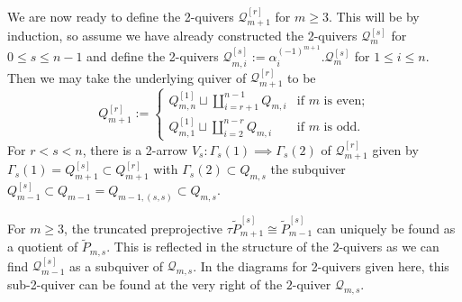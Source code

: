 \documentclass[smallextended,envcountsect,envcountsame]{svjour3}
\numberwithin{equation}{section}
\newcommand{\cQ}{\mathcal{Q}}
\begin{document}
We are now ready to define the 2-quivers $\cQ_{m+1}^{[r]}$ for $m\ge3$.
This will be by induction, so assume we have already constructed the 2-quivers $\cQ_m^{[s]}$ for $0\le s\le n-1$ and define the 2-quivers $\cQ_{m,i}^{[s]}:=\alpha_i^{(-1)^{m+1}}.\cQ_m^{[s]}$ for $1\le i\le n$. 
Then we may take the underlying quiver of $\cQ_{m+1}^{[r]}$ to be
\begin{equation}
  \label{eq:recursive 2-quivers}
  Q_{m+1}^{[r]}:=
  \begin{cases}
    Q_{m,n}^{[1]}\sqcup\coprod\limits_{i=r+1}^{n-1} Q_{m,i} & \text{if $m$ is even;}\\
    Q_{m,1}^{[1]}\sqcup\coprod\limits_{i=2}^{n-r} Q_{m,i} & \text{if $m$ is odd.}
  \end{cases}
\end{equation}
For $r<s<n$, there is a 2-arrow $V_s:\Gamma_s(1)\implies\Gamma_s(2)$ of $\cQ_{m+1}^{[r]}$ given by $\Gamma_s(1)=Q_{m+1}^{[s]}\subset Q_{m+1}^{[r]}$ with $\Gamma_s(2)\subset Q_{m,s}$ the subquiver $Q_{m-1}^{[s]}\subset Q_{m-1}=Q_{m-1,(s,s)}\subset Q_{m,s}$.
\begin{remark}
  For $m\geq 3$, the truncated preprojective $\tau\tilde P_{m+1}^{[s]}\cong\tilde P_{m-1}^{[s]}$ can uniquely be found as a quotient of $\tilde P_{m,s}$.
  This is reflected in the structure of the $2$-quivers as we can find $\cQ_{m-1}^{[s]}$ as a subquiver of $\cQ_{m,s}$.
  In the diagrams for 2-quivers given here, this sub-2-quiver can be found at the very right of the $2$-quiver $\mathcal Q_{m,s}$.
\end{remark}
\end{document}
